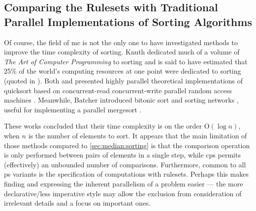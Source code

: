 
\subsection{Comparing the  Rulesets with Traditional Parallel Implementations of Sorting Algorithms}

Of course, the field of \gls{mc} is not the only one to have investigated methods to improve the time complexity of sorting.  Knuth dedicated much of a volume of \textit{The Art of Computer Programming} to sorting \cite{Knuth1998} and is said to have estimated that 25\% of the world's computing resources at one point were dedicated to sorting (quoted in \cite{Powers1991}).  Both \citeauthor{Powers1991} \cite{Powers1991} and \citeauthor{Chlebus1991} \cite{Chlebus1991} presented highly parallel theoretical implementations of quicksort based on concurrent-read concurrent-write parallel random access machines \cite{JaJa2011}.  Meanwhile, Batcher introduced bitonic sort and sorting networks \cite{Akl2011}, useful for implementing a parallel mergesort \cite{Lee1995}.

These works concluded that their time complexity is on the order O\((\log n)\), when \(n\) is the number of elements to sort.  It appears that the main limitation of those methods compared to \cref{sec:median:sorting} is that the comparison operation is only performed between pairs of elements in a single step, while \gls{cps} permits (effectively) an unbounded number of comparisons.  Furthermore, common to all \gls{ps} variants is the specification of computations with \glspl{ruleset}.  Perhaps this makes finding and expressing the inherent parallelism of a problem easier --- the more declarative/less imperative style may allow the exclusion from consideration of irrelevant details and a focus on important ones.